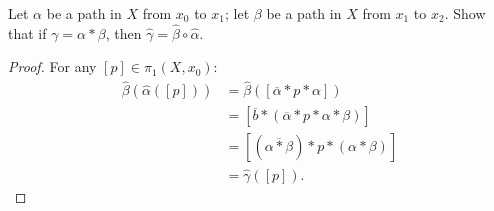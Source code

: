 \documentclass[10pt,oneside,openany]{memoir}
\begin{document}
\begin{exercise}
Let $\alpha$ be a path in $X$ from $x_0$ to $x_1$; let $\beta$ be a path in $X$ from $x_1$ to $x_2$. Show that if $\gamma = \alpha \ast \beta$, then $\hat{\gamma} = \hat{\beta} \circ \hat{\alpha}$.
\end{exercise}
    \begin{proof}
        For any $[p] \in \pi_1(X,x_0)$:
            \begin{equation*}
            \begin{split}
                \hat{\beta} \left( \hat{\alpha}([p]) \right)
                & = \hat{\beta} ( [ \overline{\alpha} \ast p \ast \alpha]) \\
                & = [\overline{b} \ast (\overline{\alpha} \ast p \ast \alpha \ast \beta)] \\
                & = [(\overline{\alpha \ast \beta}) \ast p \ast (\alpha \ast \beta)] \\
                & = \hat{\gamma}([p]).
            \end{split}
            \end{equation*}
    \end{proof}
\end{document}
